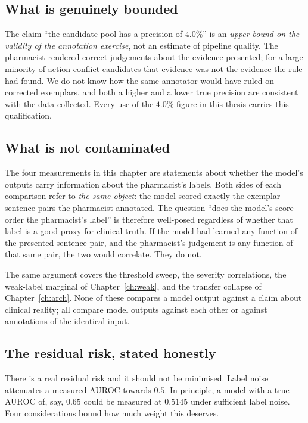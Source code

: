 \subsection{What is genuinely bounded}

The claim ``the candidate pool has a precision of $4.0\%$'' is an
\emph{upper bound on the validity of the annotation exercise}, not an estimate
of pipeline quality. The pharmacist rendered correct judgements about the
evidence presented; for a large minority of action-conflict candidates that
evidence was not the evidence the rule had found. We do not know how the same
annotator would have ruled on corrected exemplars, and both a higher and a
lower true precision are consistent with the data collected. Every use of the
$4.0\%$ figure in this thesis carries this qualification.

\subsection{What is not contaminated}

The four measurements in this chapter are statements about whether the model's
outputs carry information about the pharmacist's labels. Both sides of each
comparison refer to \emph{the same object}: the model scored exactly the
exemplar sentence pairs the pharmacist annotated. The question ``does the model's
score order the pharmacist's label'' is therefore well-posed regardless of
whether that label is a good proxy for clinical truth. If the model had learned
any function of the presented sentence pair, and the pharmacist's judgement is
any function of that same pair, the two would correlate. They do not.

The same argument covers the threshold sweep, the severity correlations, the
weak-label marginal of Chapter~\ref{ch:weak}, and the transfer collapse of
Chapter~\ref{ch:arch}. None of these compares a model output against a claim
about clinical reality; all compare model outputs against each other or against
annotations of the identical input.

\subsection{The residual risk, stated honestly}

There is a real residual risk and it should not be minimised. Label noise
attenuates a measured AUROC towards $0.5$. In principle, a model with a true
AUROC of, say, $0.65$ could be measured at $0.5145$ under sufficient label noise.
Four considerations bound how much weight this deserves.

